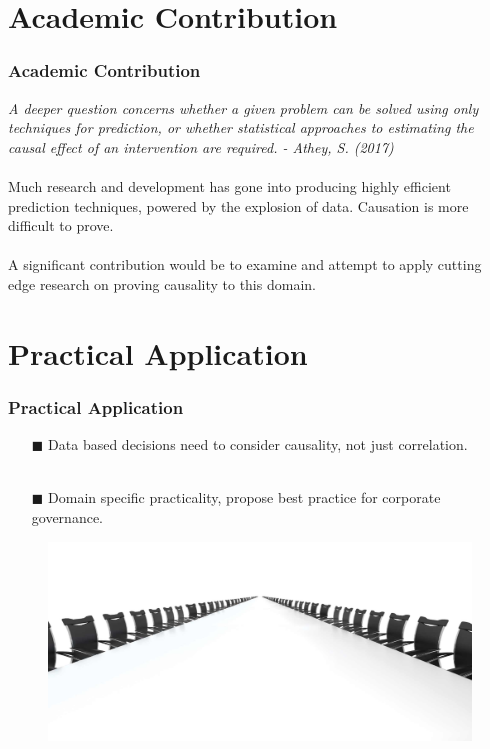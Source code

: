 \documentclass{beamer}
\begin{document}
\section {Academic Contribution}
\begin{frame}[t]
\frametitle{Academic Contribution}
{\it \small A deeper question concerns whether a given problem can be solved using only techniques for prediction, or whether statistical approaches to estimating the causal effect of an intervention are required. - Athey, S. (2017)}\\~\\
{Much research and development has gone into producing highly efficient prediction techniques, powered by the explosion of data. Causation is more difficult to prove.  }
\\~\\
{A significant contribution would be to examine and attempt to apply cutting edge research on proving causality to this domain.}

\end{frame}
\section {Practical Application}
\begin{frame}[t]
\frametitle{Practical Application}
\begin{itemize}
\item[$\blacksquare$] Data based decisions need to consider causality, not just correlation.
\\~\\
\item[$\blacksquare$] Domain specific practicality, propose best practice for corporate governance.
\end{itemize}
\begin{figure}[h]
\centering 
\includegraphics[scale=0.1]{images/boardroom.jpg}
\end {figure}

\end{frame}
\end{document}
